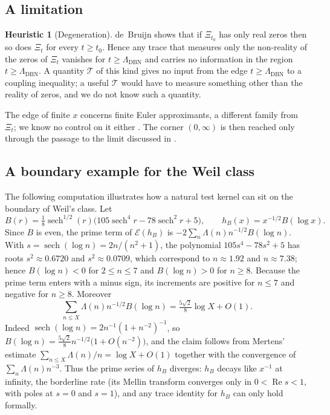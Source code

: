 \documentclass[11pt]{amsart}
\theoremstyle{definition}
\newtheorem{heuristic}[theorem]{Heuristic}
\theoremstyle{remark}
\newcommand{\Ecal}{\mathcal{E}}
\newcommand{\LDBN}{\Lambda_{\mathrm{DBN}}}
\DeclareMathOperator{\Real}{Re}
\newcommand{\La}{\Lambda}
\begin{document}
\subsection{A limitation}

\begin{heuristic}[Degeneration]\label{thm:formA-degeneration}
de~Bruijn \cite[Thm.~13]{deBruijn50} shows that if $\Xi_{t_0}$ has only real zeros then so
does $\Xi_t$ for every $t\ge t_0$. Hence any trace that measures only the non-reality of the
zeros of $\Xi_t$ vanishes for $t\ge\LDBN$ and carries no information in the region $t\ge\LDBN$. A
quantity $\mathcal T$ of this kind gives no input from the edge $t\ge\LDBN$ to a coupling
inequality; a useful $\mathcal T$ would have to measure something other than the reality of
zeros, and we do not know such a quantity.
\end{heuristic}

The edge of finite $x$ concerns finite Euler approximants, a different family from $\Xi_t$; we
know no control on it either \cite[\S6]{P27}. The corner $(0,\infty)$ is then reached only
through the passage to the limit discussed in \cite[\S5.1]{P27}.

\subsection{A boundary example for the Weil class}
The following computation illustrates how a natural test kernel can sit on the boundary of
Weil's class. Let
\[
B(r)=\tfrac18\operatorname{sech}^{1/2}(r)\bigl(105\operatorname{sech}^4 r-78\operatorname{sech}^2
r+5\bigr),\qquad h_B(x)=x^{-1/2}B(\log x).
\]
Since $B$ is even, the prime term of $\Ecal(h_B)$ is $-2\sum_n\La(n)n^{-1/2}B(\log n)$. With
$s=\operatorname{sech}(\log n)=2n/(n^2+1)$, the polynomial $105s^4-78s^2+5$ has roots
$s^2\approx0.6720$ and $s^2\approx0.0709$, which correspond to $n\approx1.92$ and
$n\approx7.38$; hence $B(\log n)<0$ for $2\le n\le7$ and $B(\log n)>0$ for $n\ge8$. Because the
prime term enters with a minus sign, its increments are positive for $n\le7$ and negative for
$n\ge8$. Moreover
\[
\sum_{n\le X}\La(n)n^{-1/2}B(\log n)=\tfrac{5\sqrt2}{8}\log X+O(1).
\]
Indeed $\operatorname{sech}(\log n)=2n^{-1}(1+n^{-2})^{-1}$, so
$B(\log n)=\tfrac{5\sqrt2}{8}n^{-1/2}\bigl(1+O(n^{-2})\bigr)$, and the claim follows from
Mertens' estimate $\sum_{n\le X}\La(n)/n=\log X+O(1)$ \cite{bgMV} together with the
convergence of $\sum_n\La(n)n^{-3}$. Thus the prime series of $h_B$ diverges: $h_B$ decays like
$x^{-1}$ at infinity, the borderline rate (its Mellin transform converges only in
$0<\Real s<1$, with poles at $s=0$ and $s=1$), and any trace identity for $h_B$ can only hold formally.
\end{document}
